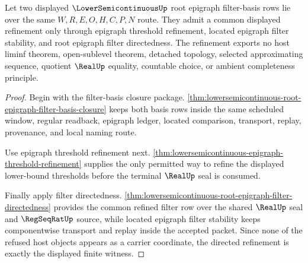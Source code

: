 \begin{theorem}
\label{thm:lowersemicontinuous-root-filter-basis-directed-refinement}
Let two displayed $\LowerSemicontinuousUp$ root epigraph filter-basis rows lie over the same $W,R,E,O,H,C,P,N$ route. They admit a common displayed refinement only through epigraph threshold refinement, located epigraph filter stability, and root epigraph filter directedness. The refinement exports no host liminf theorem, open-sublevel theorem, detached topology, selected approximating sequence, quotient $\RealUp$ equality, countable choice, or ambient completeness principle.
\end{theorem}
\begin{proof}
Begin with the filter-basis closure package. \autoref{thm:lowersemicontinuous-root-epigraph-filter-basis-closure} keeps both basis rows inside the same scheduled window, regular readback, epigraph ledger, located comparison, transport, replay, provenance, and local naming route.

Use epigraph threshold refinement next. \autoref{thm:lowersemicontinuous-epigraph-threshold-refinement} supplies the only permitted way to refine the displayed lower-bound thresholds before the terminal $\RealUp$ seal is consumed.

Finally apply filter directedness. \autoref{thm:lowersemicontinuous-root-epigraph-filter-directedness} provides the common refined filter row over the shared $\RealUp$ seal and $\RegSeqRatUp$ source, while located epigraph filter stability keeps componentwise transport and replay inside the accepted packet. Since none of the refused host objects appears as a carrier coordinate, the directed refinement is exactly the displayed finite witness.
\end{proof}

